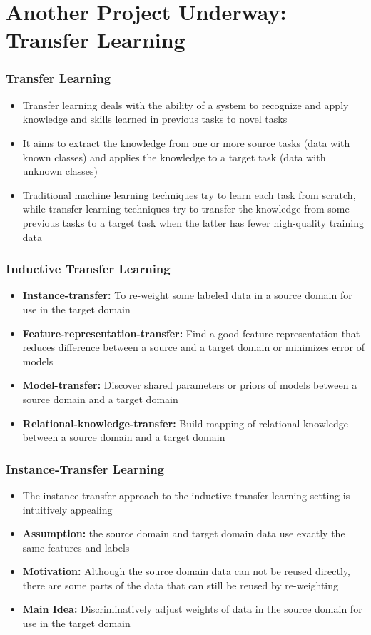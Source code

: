 \documentclass[compress]{beamer}
\begin{document}
\section{Another Project Underway: Transfer Learning}
\begin{frame}
\frametitle{Transfer Learning} 
\begin{itemize}%
 \item Transfer learning deals with the ability of a system to recognize and apply knowledge and skills learned in previous tasks to novel tasks
 \item It aims to extract the knowledge from one or more source tasks (data with known classes) and applies the knowledge to a target task (data with unknown classes)
 \item Traditional machine learning techniques try to learn each task from scratch, while transfer learning techniques try to transfer the knowledge from some previous tasks to a target task when the latter has fewer high-quality training data
\end{itemize}
\end{frame}

\begin{frame}
\frametitle{Inductive Transfer Learning} 
\begin{itemize}%
 \item \textbf{Instance-transfer:} To re-weight some labeled data in a source domain for use in the target domain %
 \item \textbf{Feature-representation-transfer:} Find a good feature representation that reduces difference between a source and a target domain or minimizes error of models
 \item \textbf{Model-transfer:} Discover shared parameters or priors of models between a source domain and a target domain
 \item \textbf{Relational-knowledge-transfer:} Build mapping of relational knowledge between a source domain and a target domain
 \end{itemize}
\end{frame}

\begin{frame}
\frametitle{Instance-Transfer Learning} 
\begin{itemize}%
 \item The instance-transfer approach to the inductive transfer learning setting is intuitively appealing
 \item \textbf{Assumption:} the source domain and target domain data use exactly the same features and labels
 \item \textbf{Motivation:} Although the source domain data can not be reused directly, there are some parts of the data that can still be reused by re-weighting
 \item \textbf{Main Idea:} Discriminatively adjust weights of data in the source domain for use in the target domain 
 \end{itemize}
\end{frame}
\end{document}
